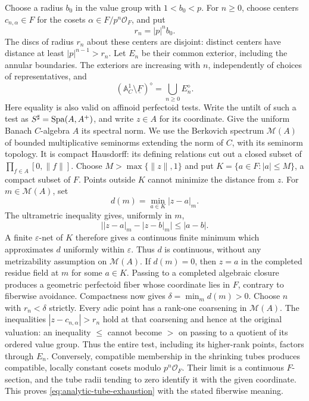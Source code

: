 Choose a radius \(b_0\) in the value group with \(1<b_0<p\).
For \(n\geq0\), choose centers \(c_{n,\alpha}\in F\) for the cosets
\(\alpha\in F/p^n\mathcal O_F\), and put
\[
 r_n=|p|^n b_0.
\]
The discs of radius \(r_n\) about these centers are disjoint:
distinct centers have distance at least
\(|p|^{n-1}>r_n\).  Let \(E_n\) be their common exterior, including
the annular boundaries.  The exteriors are increasing with \(n\),
independently of choices of representatives, and
\begin{equation}
 (\mathbb A^1_C\setminus\underline F)^\diamond
      =\bigcup_{n\geq0} E_n^\diamond.
 \label{eq:analytic-tube-exhaustion}
\end{equation}
Here equality is also valid on affinoid perfectoid tests.
Write the untilt of such a test as \(S^\sharp=\operatorname{Spa}(A,A^+)\),
and write \(z\in A\) for its coordinate.  Give the uniform Banach
\(C\)-algebra \(A\) its spectral norm.  We use the Berkovich
spectrum \(\mathcal M(A)\) of bounded multiplicative seminorms
extending the norm of \(C\), with its seminorm topology.
It is compact Hausdorff: its defining relations cut out a closed
subset of \(\prod_{f\in A}[0,\|f\|]\).
Choose \(M>\max\{\|z\|,1\}\) and put
\(K=\{a\in F:|a|\leq M\}\), a compact subset of \(F\).
Points outside \(K\) cannot minimize the distance from \(z\).
For \(m\in\mathcal M(A)\), set
\[
 d(m)=\min_{a\in K}|z-a|_m.
\]
The ultrametric inequality gives, uniformly in \(m\),
\[
 \bigl||z-a|_m-|z-b|_m\bigr|\leq |a-b|.
\]
A finite \(\varepsilon\)-net of \(K\) therefore gives a
continuous finite minimum which approximates \(d\) uniformly
within \(\varepsilon\).  Thus \(d\) is continuous, without any
metrizability assumption on \(\mathcal M(A)\).
If \(d(m)=0\), then \(z=a\) in the completed residue field at
\(m\) for some \(a\in K\).  Passing to a completed algebraic
closure produces a geometric perfectoid fiber whose coordinate
lies in \(F\), contrary to fiberwise avoidance.  Compactness now
gives \(\delta=\min_m d(m)>0\).
Choose \(n\) with \(r_n<\delta\) strictly.  Every adic point
has a rank-one coarsening in \(\mathcal M(A)\).  The inequalities
\(|z-c_{n,\alpha}|>r_n\) hold at that coarsening and hence at
the original valuation: an inequality \(\leq\) cannot become
\(>\) on passing to a quotient of its ordered value group.
Thus the entire test, including its higher-rank points, factors
through \(E_n\).
Conversely, compatible membership in the shrinking tubes produces
compatible, locally constant cosets modulo \(p^n\mathcal O_F\).
Their limit is a continuous \(F\)-section, and the tube radii tending
to zero identify it with the given coordinate.  This proves
\eqref{eq:analytic-tube-exhaustion} with the stated fiberwise
meaning.

